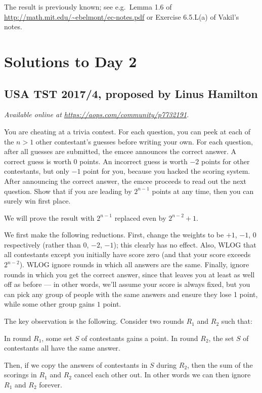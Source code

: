 \documentclass[11pt]{scrartcl}
\begin{document}
\begin{remark*}
  The result is previously known; see e.g.\
  Lemma 1.6 of \url{http://math.mit.edu/~ebelmont/ec-notes.pdf}
  or Exercise 6.5.L(a) of Vakil's notes.
\end{remark*}
\pagebreak

\section{Solutions to Day 2}
\subsection{USA TST 2017/4, proposed by Linus Hamilton}
\textsl{Available online at \url{https://aops.com/community/p7732191}.}
\begin{mdframed}[style=mdpurplebox,frametitle={Problem statement}]
You are cheating at a trivia contest.
For each question, you can peek at each of the
$n > 1$ other contestant's guesses before writing your own.
For each question, after all guesses are submitted, the emcee announces the correct answer.
A correct guess is worth $0$ points.
An incorrect guess is worth $-2$ points for other contestants,
but only $-1$ point for you, because you hacked the scoring system.
After announcing the correct answer, the emcee proceeds to read out the next question.
Show that if you are leading by $2^{n-1}$ points at any time,
then you can surely win first place.
\end{mdframed}
We will prove the result with $2^{n-1}$ replaced
even by $2^{n-2}+1$.

We first make the following reductions.
First, change the weights to be $+1$, $-1$, $0$ respectively
(rather than $0$, $-2$, $-1$); this clearly has no effect.
Also, WLOG that all contestants except you initially have score zero
(and that your score exceeds $2^{n-2}$).
WLOG ignore rounds in which all answers are the same.
Finally, ignore rounds in which you get the correct answer,
since that leaves you at least as well off as before --- in other words,
we'll assume your score is always fixed,
but you can pick any group of people with the same answers
and ensure they lose 1 point,
while some other group gains $1$ point.

The key observation is the following.
Consider two rounds $R_1$ and $R_2$ such that:
\begin{itemize}
  \ii In round $R_1$, some set $S$ of contestants gains a point.
  \ii In round $R_2$, the set $S$ of contestants all have the same answer.
\end{itemize}
Then, if we copy the answers of contestants in $S$ during $R_2$,
then the sum of the scorings in $R_1$ and $R_2$ cancel each other out.
In other words we can then ignore $R_1$ and $R_2$ forever.
\end{document}
